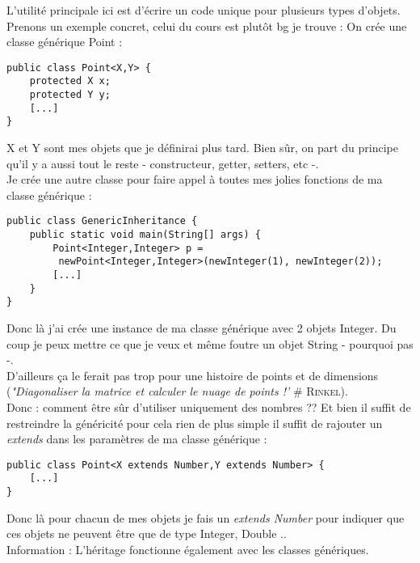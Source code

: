 \documentclass{article}
\begin{document}
\noindent
L'utilité principale ici est d'écrire un code unique pour plusieurs types d'objets. Prenons un exemple concret, celui du cours est plutôt bg je trouve :
On crée une classe générique Point :
\begin{lstlisting}
public class Point<X,Y> {
	protected X x;
	protected Y y;
	[...]
}
\end{lstlisting}
X et Y sont mes objets que je définirai plus tard. Bien sûr, on part du principe qu'il y a aussi tout le reste - constructeur, getter, setters, etc -.\\
Je crée une autre classe pour faire appel à toutes mes jolies fonctions de ma classe générique :

\begin{lstlisting}
public class GenericInheritance {
	public static void main(String[] args) {
		Point<Integer,Integer> p =
		 newPoint<Integer,Integer>(newInteger(1), newInteger(2));
		[...]
	}
}
\end{lstlisting}
Donc là j'ai crée une instance de ma classe générique avec 2 objets Integer. Du coup je peux mettre ce que je veux et même foutre un objet String - pourquoi pas -.\\
D'ailleurs ça le ferait pas trop pour une histoire de points et de dimensions (\emph{"Diagonaliser la matrice et calculer le nuage de points !'} \# \textsc{Rinkel}).\\
Donc : comment être sûr d'utiliser uniquement des nombres ?? Et bien il suffit de restreindre la généricité pour cela rien de plus simple il suffit de rajouter un \emph{extends} dans les paramètres de ma classe générique :
\begin{lstlisting}
public class Point<X extends Number,Y extends Number> {
	[...]
}
\end{lstlisting}
Donc là pour chacun de mes objets je fais un \emph{extends Number} pour indiquer que ces objets ne peuvent être que de type Integer, Double .. \\
Information : L'héritage fonctionne également avec les classes génériques.
\end{document}
